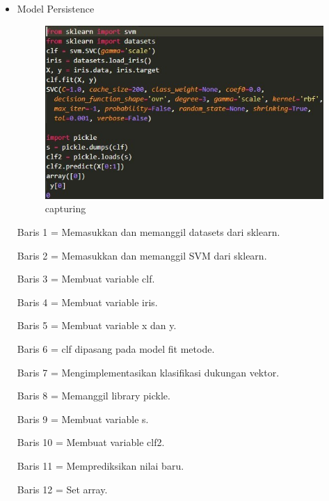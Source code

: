 \begin{itemize}
\item Model Persistence

\begin{figure}[ht]
\centering
\includegraphics[scale=0.5]{figures/Capture6.jpg}
\caption{capturing}
\label{loading an example dataset}
\end{figure}

Baris 1 = Memasukkan dan memanggil datasets dari sklearn.

Baris 2 = Memasukkan dan memanggil SVM dari sklearn.

Baris 3 = Membuat variable clf.

Baris 4 = Membuat variable iris.

Baris 5 = Membuat variable x dan y.

Baris 6 = clf dipasang pada model fit metode.

Baris 7 = Mengimplementasikan klasifikasi dukungan vektor.

Baris 8 = Memanggil library pickle.

Baris 9 = Membuat variable s.

Baris 10 = Membuat variable clf2.

Baris 11 = Memprediksikan nilai baru.

Baris 12 = Set array.

\end{itemize}

